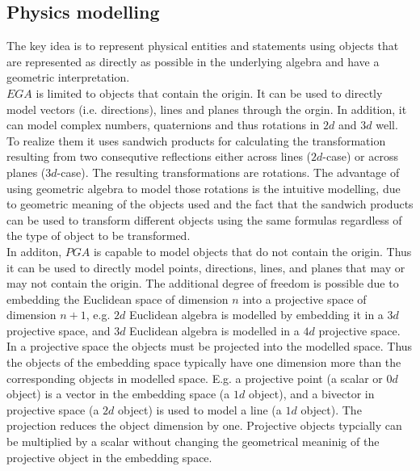 \subsection{Physics modelling}
\label{physics_modelling}

The key idea is to represent physical entities and statements using objects that are
represented as directly as possible in the underlying algebra and have a geometric
interpretation. \\

$EGA$ is limited to objects that contain the origin. It can be used to directly model
vectors (i.e. directions), lines and planes through the orgin. In addition, it can model
complex numbers, quaternions and thus rotations in $2d$ and $3d$ well. To realize them it
uses sandwich products for calculating the transformation resulting from two consequtive
reflections either across lines ($2d$-case) or across planes ($3d$-case). The resulting
transformations are rotations. The advantage of using geometric algebra to model those
rotations is the intuitive modelling, due to geometric meaning of the objects used and the
fact that the sandwich products can be used to transform different objects using the same
formulas regardless of the type of object to be transformed.\\

In additon, $PGA$ is capable to model objects that do not contain the origin. Thus it can
be used to directly model points, directions, lines, and planes that may or may not
contain the origin. The additional degree of freedom is possible due to embedding the
Euclidean space of dimension $n$ into a projective space of dimension $n+1$, e.g. $2d$
Euclidean algebra is modelled by embedding it in a $3d$ projective space, and $3d$
Euclidean algebra is modelled in a $4d$ projective space. In a projective space the
objects must be projected into the modelled space. Thus the objects of the embedding space
typically have one dimension more than the corresponding objects in modelled space. E.g. a
projective point (a scalar or $0d$ object) is a vector in the embedding space (a $1d$
object), and a bivector in projective space (a $2d$ object) is used to model a line (a
$1d$ object). The projection reduces the object dimension by one. Projective objects
typcially can be multiplied by a scalar without changing the geometrical meaninig of the
projective object in the embedding space. \\

